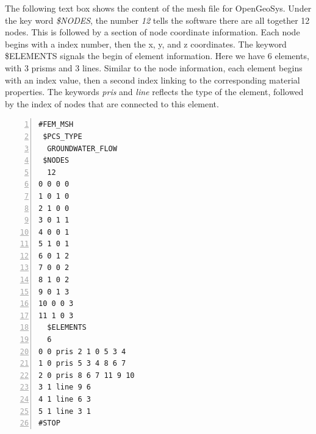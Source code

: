 The following text box shows the content of the mesh file for OpenGeoSys. Under the key word \textit{\$NODES}, the number \textit{12} tells the software there are all together 12 nodes. This is followed by a section of node coordinate information. Each node begins with a index number, then the x, y, and z coordinates. The keyword \$ELEMENTS signals the begin of element information. Here we have 6 elements, with 3 prisms and 3 lines. Similar to the node information, each element begins with an index value, then a second index linking to the corresponding material properties. The keywords \textit{pris} and \textit{line} reflects the type of the element, followed by the index of nodes that are connected to this element. 
\begin{Verbatim}[gobble=0, 
                 frame=single, 
                 label=Mesh File, 
                 numbers=left]
#FEM_MSH
 $PCS_TYPE
  GROUNDWATER_FLOW
 $NODES
  12 
0 0 0 0
1 0 1 0
2 1 0 0
3 0 1 1
4 0 0 1
5 1 0 1
6 0 1 2
7 0 0 2
8 1 0 2
9 0 1 3
10 0 0 3
11 1 0 3
  $ELEMENTS
  6 
0 0 pris 2 1 0 5 3 4
1 0 pris 5 3 4 8 6 7
2 0 pris 8 6 7 11 9 10 
3 1 line 9 6
4 1 line 6 3
5 1 line 3 1
#STOP
\end{Verbatim}

